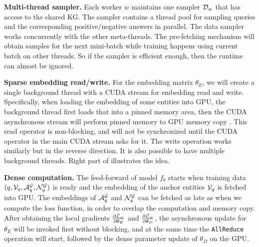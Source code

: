 \textbf{Multi-thread sampler.}
Each worker $w$ maintains one sampler $\mathcal{D}_w$ that has access to the shared KG. The sampler contains a thread pool for sampling queries and the corresponding positive/negative answers in parallel. 
% 
The data sampler works concurrently with the other meta-threads. The pre-fetching mechanism will obtain samples for the next mini-batch while training happens using current batch on other threads. So if the sampler is efficient enough, then the runtime can almost be ignored. 


\textbf{Sparse embedding read/write.}
For the embedding matrix $\theta_E$, we will create a single background thread with a CUDA stream for embedding read and write. Specifically, when loading the embedding of some entities into GPU, the background thread first loads that into a pinned memory area, then the CUDA asynchronous stream will perform pinned memory to GPU memory copy \cite{fey2021gnnautoscale}. This read operator is non-blocking, and will not be synchronized until the CUDA operator in the main CUDA stream asks for it. The write operation works similarly but in the reverse direction. It is also possible to have multiple background threads. Right part of  illustrates the idea. 

\textbf{Dense computation.}
The feed-forward of model $f_{\theta}$ starts when training data $(q, \mathcal{V}_q, \mathcal{A}_q^{\mathcal{G}}, \mathcal{N}_q^{\mathcal{G}})$ is ready and the embedding of the anchor entities $\mathcal{V}_q$ is fetched into GPU. The embeddings of $\mathcal{A}_q^{\mathcal{G}}$ and $\mathcal{N}_q^{\mathcal{G}}$ can be fetched as late as when we compute the loss function, in order to overlap the computation and memory copy. After obtaining the local gradients $\frac{\partial \mathcal{L}_w}{\partial \theta_E}$ and $\frac{\partial \mathcal{L}_w}{\partial \theta_D}$, the asynchronous update for $\theta_E$ will be invoked first without blocking,
and at the same time the \texttt{AllReduce} operation will start, followed by the dense parameter update of $\theta_D$ on the GPU. 



